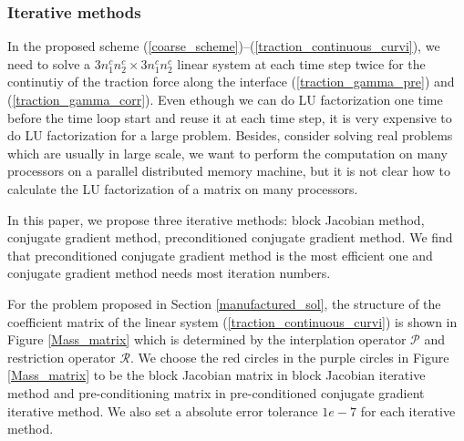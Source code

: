 \subsubsection{Iterative methods}\label{iterative_section}
In the proposed scheme (\ref{coarse_scheme})--(\ref{traction_continuous_curvi}), we need to solve a $3n_1^cn_2^c\times 3n_1^cn_2^c$ linear system at each time step twice for the continutiy of the traction force along the interface (\ref{traction_gamma_pre}) and (\ref{traction_gamma_corr}). Even ethough we can do LU factorization one time before the time loop start and reuse it at each time step, it is very expensive to do LU factorization for a large problem. Besides, consider solving real problems which are usually in large scale, we want to perform the computation on many processors on a parallel distributed memory machine, but it is not clear how to calculate the LU factorization of a matrix on many processors. 

In this paper, we propose three iterative methods: block Jacobian method, conjugate gradient method, preconditioned conjugate gradient method. We find that preconditioned conjugate gradient method is the most efficient one and conjugate gradient method needs most iteration numbers.

For the problem proposed in Section \ref{manufactured_sol}, the structure of the coefficient matrix of the linear system (\ref{traction_continuous_curvi}) is shown in Figure \ref{Mass_matrix} which is determined by the interplation operator $\mathcal{P}$ and restriction operator $\mathcal{R}$. We choose the red circles in the purple circles in Figure \ref{Mass_matrix} to be the block Jacobian matrix in block Jacobian iterative method and pre-conditioning matrix in pre-conditioned conjugate gradient iterative method. We also set a absolute error tolerance $1e-7$ for each iterative method.

